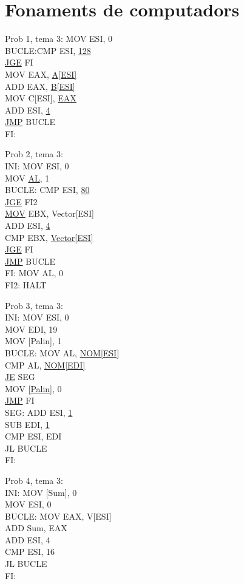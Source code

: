 \section{Fonaments de computadors}
\newpage
{}
Prob 1, tema 3:
MOV ESI, 0\\
BUCLE:\= CMP ESI, \underline{128}\\
\underline{JGE} FI\\
MOV EAX, \underline{A[ESI]}\\
ADD EAX, \underline{B[ESI]}\\
MOV C[ESI], \underline{EAX}\\
ADD ESI, \underline{4}\\
\underline{JMP} BUCLE\\
FI:

Prob 2, tema 3:\\
INI: MOV ESI, 0\\
MOV \underline{AL}, 1\\
BUCLE: CMP ESI, \underline{80}\\
\underline{JGE} FI2\\
\underline{MOV} EBX, Vector[ESI]\\
ADD ESI, \underline{4}\\
CMP EBX, \underline{Vector[ESI]}\\
\underline{JGE} FI\\
\underline{JMP} BUCLE\\
FI: MOV AL, 0\\
FI2: HALT

Prob 3, tema 3:\\
INI: MOV ESI, 0\\
MOV EDI, 19\\
MOV [Palin], 1\\ 
BUCLE: MOV AL, \underline{NOM[ESI]}\\
CMP AL, \underline{NOM[EDI]}\\
\underline{JE} SEG\\
MOV \underline{[Palin]}, 0\\
\underline{JMP} FI\\
SEG: ADD ESI, \underline{1}\\
SUB EDI, \underline{1}\\
CMP ESI, EDI\\
JL BUCLE\\
FI:

Prob 4, tema 3:\\
INI: MOV [Sum], 0\\
MOV ESI, 0\\
BUCLE: MOV EAX, V[ESI]\\
ADD Sum, EAX\\
ADD ESI, 4\\
CMP ESI, 16\\
JL BUCLE\\
FI: \\

